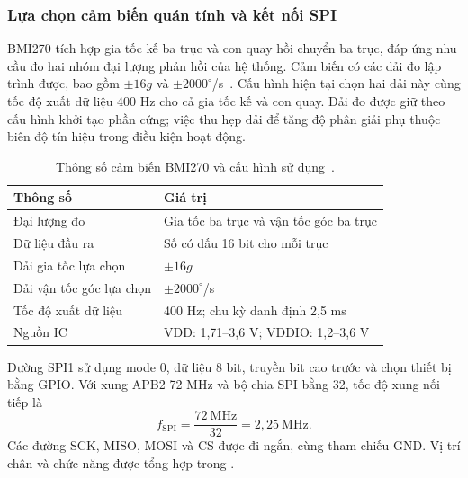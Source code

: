 \subsubsection{Lựa chọn cảm biến quán tính và kết nối SPI}

BMI270 tích hợp gia tốc kế ba trục và con quay hồi chuyển ba trục, đáp ứng nhu cầu đo hai nhóm đại lượng phản hồi của hệ thống. Cảm biến có các dải đo lập trình được, bao gồm $\pm16g$ và $\pm2000^\circ$/s~\cite{boschBmi270Datasheet}. Cấu hình hiện tại chọn hai dải này cùng tốc độ xuất dữ liệu 400 Hz cho cả gia tốc kế và con quay. Dải đo được giữ theo cấu hình khởi tạo phần cứng; việc thu hẹp dải để tăng độ phân giải phụ thuộc biên độ tín hiệu trong điều kiện hoạt động.

\begin{table}[htbp]
	\centering
	\caption{Thông số cảm biến BMI270 và cấu hình sử dụng~\cite{boschBmi270Datasheet}.}
	\label{tab:design-imu-specifications}
	\begin{tabularx}{\linewidth}{|C{4.2cm}|Y|}
		\hline
		\textbf{Thông số}        & \textbf{Giá trị}                       \\
		\hline
		Đại lượng đo             & Gia tốc ba trục và vận tốc góc ba trục \\
		\hline
		Dữ liệu đầu ra           & Số có dấu 16 bit cho mỗi trục          \\
		\hline
		Dải gia tốc lựa chọn     & $\pm16g$                               \\
		\hline
		Dải vận tốc góc lựa chọn & $\pm2000^\circ$/s                      \\
		\hline
		Tốc độ xuất dữ liệu      & 400 Hz; chu kỳ danh định 2,5 ms        \\
		\hline
		Nguồn IC                 & VDD: 1,71--3,6 V; VDDIO: 1,2--3,6 V    \\
		\hline
	\end{tabularx}
\end{table}

Đường SPI1 sử dụng mode 0, dữ liệu 8 bit, truyền bit cao trước và chọn thiết bị bằng GPIO. Với xung APB2 72 MHz và bộ chia SPI bằng 32, tốc độ xung nối tiếp là
\begin{equation}
	f_{\mathrm{SPI}}=\frac{72\ \mathrm{MHz}}{32}
	=2{,}25\ \mathrm{MHz}.
	\label{eq:design-spi-clock}
\end{equation}
Các đường SCK, MISO, MOSI và CS được đi ngắn, cùng tham chiếu GND. Vị trí chân và chức năng được tổng hợp trong .

